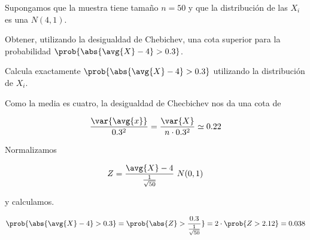 \begin{problem}[2] Supongamos que la muestra tiene tamaño $n=50$ y que la distribución de las $X_i$ es una $N(4,1)$. 

\ppart Obtener, utilizando la desigualdad de Chebichev, una cota superior para la probabilidad $\prob{\abs{\avg{X} - 4} > 0.3}$.

\ppart Calcula exactamente $\prob{\abs{\avg{X} - 4} > 0.3}$ utilizando la distribución de $X_i$. 

\solution
\spart

Como la media es cuatro, la desigualdad de Checbichev nos da una cota de 

\[ \frac{\var{\avg{x}}}{0.3^2} = \frac{\var{X}}{n \cdot 0.3^2} \simeq 0.22 \]


\spart

Normalizamos

\[ Z = \frac{\avg{X} - 4}{\frac{1}{\sqrt{50}}} ~ N(0,1) \]

y calculamos.

\[ \prob{\abs{\avg{X} - 4} > 0.3} = \prob{\abs{Z} > \frac{0.3}{\frac{1}{\sqrt{50}}}} = 2 \cdot \prob{Z > 2.12} = 0.038 \]

\end{problem}

